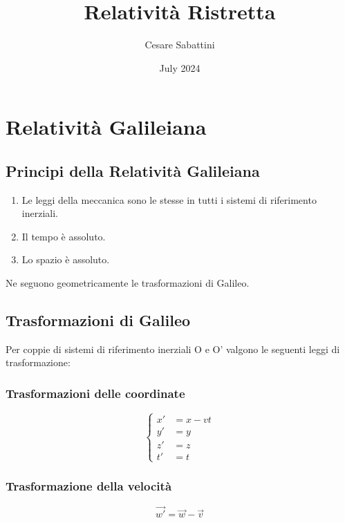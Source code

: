 \documentclass{article}
\title{
    Relatività Ristretta
}
\author{Cesare Sabattini}
\date{July 2024}
\begin{document}
\maketitle

\section{
  Relatività Galileiana
 }

\subsection{Principi della Relatività Galileiana}

\begin{enumerate}
    \item Le leggi della meccanica sono le stesse in tutti i sistemi di riferimento inerziali.
    \item Il tempo è assoluto.
    \item Lo spazio è assoluto.
\end{enumerate}

Ne seguono geometricamente le trasformazioni di Galileo.

\subsection{Trasformazioni di Galileo}
Per coppie di sistemi di riferimento inerziali O e O' valgono le seguenti leggi di trasformazione:

\subsubsection{
    Trasformazioni delle coordinate
}
\begin{equation}
    \left\{
    \begin{aligned}
        x' & = x - vt \\
        y' & = y      \\
        z' & = z      \\
        t' & = t
    \end{aligned}
    \right.
\end{equation}

\subsubsection{
    Trasformazione della velocità
}
\begin{equation}
    \vec{w'} = \vec{w} - \vec{v}
\end{equation}
\end{document}
